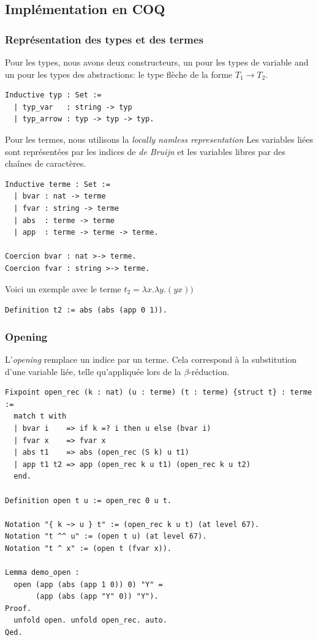 \documentclass[11pt]{book}
\begin{document}
\subsection{Implémentation en COQ}
\subsubsection{Représentation des types et des termes}
Pour les types, nous avons deux constructeurs, un pour les types de variable and un
 pour les types des abstractions: le type flèche de la forme  $T_1 \rightarrow T_2$.

\begin{Verbatim}
Inductive typ : Set :=
  | typ_var   : string -> typ
  | typ_arrow : typ -> typ -> typ.
\end{Verbatim}

Pour les termes, nous utilisons la \textit{locally namless representation}
Les variables liées sont représentées par les indices de \textit{de Bruijn} et les variables 
libres par des chaînes de caractères.
\begin{Verbatim}
Inductive terme : Set :=
  | bvar : nat -> terme
  | fvar : string -> terme
  | abs  : terme -> terme
  | app  : terme -> terme -> terme.

Coercion bvar : nat >-> terme.
Coercion fvar : string >-> terme.
\end{Verbatim}
Voici un exemple avec le terme $t_2 = \lambda x.\lambda y. (y x)) $

\verb+Definition t2 := abs (abs (app 0 1)).+

\subsubsection{Opening}
L'\textit{opening} remplace un indice par un terme. 
Cela correspond à la substitution d'une variable liée, telle qu'appliquée lors de la 
$\beta$-réduction.

\begin{Verbatim}
Fixpoint open_rec (k : nat) (u : terme) (t : terme) {struct t} : terme :=
  match t with
  | bvar i    => if k =? i then u else (bvar i)
  | fvar x    => fvar x
  | abs t1    => abs (open_rec (S k) u t1)
  | app t1 t2 => app (open_rec k u t1) (open_rec k u t2)
  end.

Definition open t u := open_rec 0 u t.

Notation "{ k ~> u } t" := (open_rec k u t) (at level 67).
Notation "t ^^ u" := (open t u) (at level 67).
Notation "t ^ x" := (open t (fvar x)).

Lemma demo_open :
  open (app (abs (app 1 0)) 0) "Y" =
       (app (abs (app "Y" 0)) "Y").
Proof.
  unfold open. unfold open_rec. auto.
Qed.
\end{Verbatim}
\end{document}
